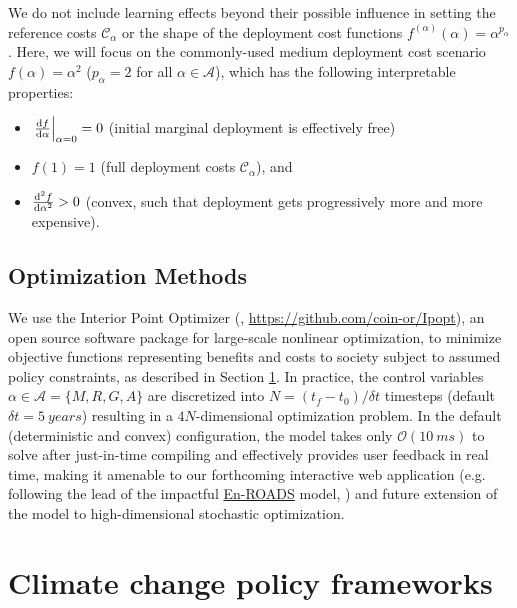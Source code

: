 \documentclass{article}
\begin{document}
We do not include learning effects beyond their possible influence in setting the reference costs $\mathcal{C}_{\alpha}$ or the shape of the deployment cost functions $f^{(\alpha)}(\alpha) = \alpha^{p_{\alpha}}$. Here, we will focus on the commonly-used medium deployment cost scenario $f(\alpha) = \alpha^{2}$ ($p_{\alpha} = 2$ for all $\alpha \in \mathcal{A}$), which has the following interpretable properties: 
\begin{itemize}
    \item $\left. \dv{f}{\alpha}\right|_{\alpha=0} = 0$ (initial marginal deployment is effectively free)
    \item $f(1) = 1$ (full deployment costs $\mathcal{C}_{\alpha}$), and
    \item $\dv[2]{f}{\alpha} > 0$ (convex, such that deployment gets progressively more and more expensive).
\end{itemize}

\subsection{Optimization Methods}

We use the Interior Point Optimizer (\citealt{wachter_implementation_2006}, \url{https://github.com/coin-or/Ipopt}), an open source software package for large-scale nonlinear optimization, to minimize objective functions representing benefits and costs to society subject to assumed policy constraints, as described in Section \ref{sec.policy_frameworks}. In practice, the control variables $\alpha \in \mathcal{A} = \{ M, R, G, A\}$ are discretized into $N = (t_{f} - t_{0}) / \delta t$ timesteps (default $\delta t = \SI{5}{years}$) resulting in a $4N$-dimensional optimization problem. In the default (deterministic and convex) configuration, the model takes only $\mathcal{O}(\SI{10}{ms})$ to solve after just-in-time compiling and effectively provides user feedback in real time, making it amenable to our forthcoming interactive web application (e.g. following the lead of the impactful \href{https://en-roads.climateinteractive.org/scenario.html?v=2.7.11}{En-ROADS} model, \citealt{siegel2018roads}) and future extension of the model to high-dimensional stochastic optimization.

\section{Climate change policy frameworks}\label{sec.policy_frameworks}
\end{document}

